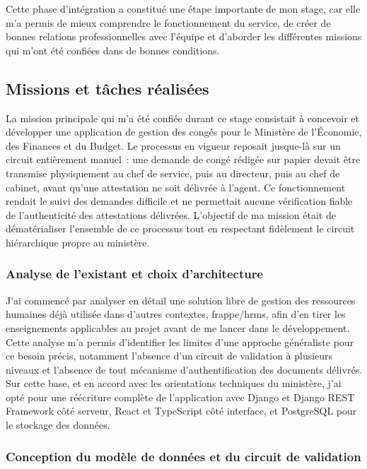 \documentclass[12pt,a4paper]{article}
\begin{document}
Cette phase d’intégration a constitué une étape importante de mon stage, car elle m’a permis de mieux comprendre le fonctionnement du service, de créer de bonnes relations professionnelles avec l’équipe et d’aborder les différentes missions qui m’ont été confiées dans de bonnes conditions.


\subsection{Missions et tâches réalisées}

La mission principale qui m'a été confiée durant ce stage consistait à concevoir et développer une application de gestion des congés pour le Ministère de l'Économie, des Finances et du Budget. Le processus en vigueur reposait jusque-là sur un circuit entièrement manuel~: une demande de congé rédigée sur papier devait être transmise physiquement au chef de service, puis au directeur, puis au chef de cabinet, avant qu'une attestation ne soit délivrée à l'agent. Ce fonctionnement rendait le suivi des demandes difficile et ne permettait aucune vérification fiable de l'authenticité des attestations délivrées. L'objectif de ma mission était de dématérialiser l'ensemble de ce processus tout en respectant fidèlement le circuit hiérarchique propre au ministère.

\subsubsection{Analyse de l'existant et choix d'architecture}

J'ai commencé par analyser en détail une solution libre de gestion des ressources humaines déjà utilisée dans d'autres contextes, frappe/hrms, afin d'en tirer les enseignements applicables au projet avant de me lancer dans le développement. Cette analyse m'a permis d'identifier les limites d'une approche généraliste pour ce besoin précis, notamment l'absence d'un circuit de validation à plusieurs niveaux et l'absence de tout mécanisme d'authentification des documents délivrés. Sur cette base, et en accord avec les orientations techniques du ministère, j'ai opté pour une réécriture complète de l'application avec Django et Django REST Framework côté serveur, React et TypeScript côté interface, et PostgreSQL pour le stockage des données.

\subsubsection{Conception du modèle de données et du circuit de validation}
\end{document}
